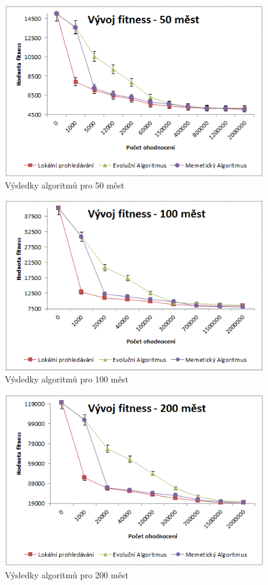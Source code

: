 \documentclass[journal]{IEEEtrancz}
\begin{document}
\begin{figure}[ht]
  \centering
    \includegraphics{results_50M}
      \caption{Výsledky algoritmů pro 50 měst}
    \label{fig:r50m}
\end{figure}

\begin{figure}[ht]
  \centering
    \includegraphics{results_100M}
      \caption{Výsledky algoritmů pro 100 měst}
    \label{fig:r100m}
\end{figure}

\begin{figure}[ht]
  \centering
    \includegraphics{results_200M}
      \caption{Výsledky algoritmů pro 200 měst}
    \label{fig:r200m}
\end{figure}
\end{document}
